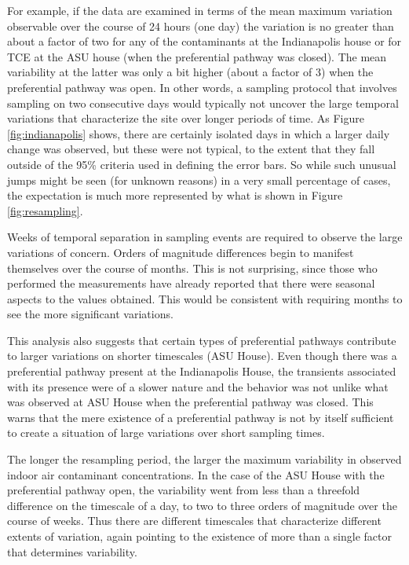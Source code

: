 \documentclass[preprint,12pt]{elsarticle}
\begin{document}
For example, if the data are examined in terms of the mean maximum variation observable over the course of 24 hours (one day) the variation is no greater than about a factor of two for any of the contaminants at the Indianapolis house or for TCE at the ASU house (when the preferential pathway was closed).
The mean variability at the latter was only a bit higher (about a factor of 3) when the preferential pathway was open.
In other words, a sampling protocol that involves sampling on two consecutive days would typically not uncover the large temporal variations that characterize the site over longer periods of time.
As Figure \ref{fig:indianapolis} shows, there are certainly isolated days in which a larger daily change was observed, but these were not typical, to the extent that they fall outside of the 95\% criteria used in defining the error bars.
So while such unusual jumps might be seen (for unknown reasons) in a very small percentage of cases, the expectation is much more represented by what is shown in Figure \ref{fig:resampling}.\par

Weeks of temporal separation in sampling events are required to observe the large variations of concern.
Orders of magnitude differences begin to manifest themselves over the course of months.
This is not surprising, since those who performed the measurements have already reported that there were seasonal aspects to the values obtained.
This would be consistent with requiring months to see the more significant variations.\par

This analysis also suggests that certain types of preferential pathways contribute to larger variations on shorter timescales (ASU House).
Even though there was a preferential pathway present at the Indianapolis House, the transients associated with its presence were of a slower nature and the behavior was not unlike what was observed at ASU House when the preferential pathway was closed.
This warns that the mere existence of a preferential pathway is not by itself sufficient to create a situation of large variations over short sampling times.\par

The longer the resampling period, the larger the maximum variability in observed indoor air contaminant concentrations.
In the case of the ASU House with the preferential pathway open, the variability went from less than a threefold difference on the timescale of a day, to two to three orders of magnitude over the course of weeks.
Thus there are different timescales that characterize different extents of variation, again pointing to the existence of more than a single factor that determines variability.\par
\end{document}
